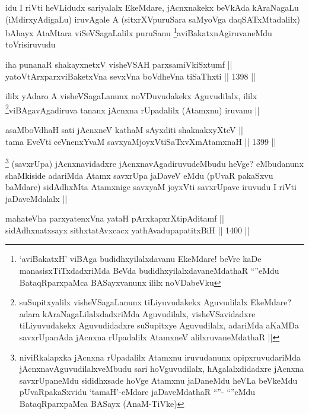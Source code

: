 \begin{artha}
idu I riVti heVLidudx sariyalalx EkeMdare, jAcnxnakekx beVkAda kAraNagaLu (iMdirxyAdigaLu) iruvAgale A (sitxrXVpuruSara saMyoVga daqSATxMtadalilx) bAhayx AtaMtara viSeVSagaLalilx puruSanu \footnote{`aviBakatxH' viBAga budidhxyilalxdavanu EkeMdare! beVre kaDe manasisxTiTxdadxriMda BeVda budidhxyilalxdavaneMdathaR ``\stext''eMdu BataqRparxpaMca BASayxvanunx ililx noVDabeVku}aviBakatxnAgiruvaneMdu toVrisiruvudu
\end{artha}

\begin{shl}
iha punanaR shakayxnetxV visheVSAH parxsamiVkiSxtumf || \\
yatoV\s tArxparxviBaketxVna sevxVna boVdheVna tiSaThxti ||  1398 ||  
\end{shl}

\begin{artha}
ililx yAdaro A visheVSagaLanunx noVDuvudakekx Aguvudilalx, ililx \footnote{suSupitxyalilx visheVSagaLanunx tiLiyuvudakekx Aguvudilalx EkeMdare? adara kAraNagaLilalxdadxriMda Aguvudilalx, visheVSavidadxre tiLiyuvudakekx Aguvudidadxre suSupitxye Aguvudilalx, adariMda aKaMDa savxrUpanAda jAcnxna rUpadalilx AtamxneV alilxruvaneMdathaR ||}viBAgavAgadiruva tananx jAcnxna rUpadalilx (Atamxnu) iruvanu ||
\end{artha}


\begin{shl}
asaMboVdhaH sati jAcnxneV kathaM sAyxditi shaknakxyXteV || \\
tama EveVti ceVnenxYvaM savxyaMjoyxVtiSaTxvXmAtamxnaH ||  1399 ||  
\end{shl}

\begin{artha}
\footnote{niviRkalapxka jAcnxna rUpadalilx Atamxnu iruvudanunx opipxruvudariMda jAcnxnavAguvudilalxveMbudu sari hoVguvudilalx, hAgalalxdidadxre jAcnxna savxrUpaneMdu sididhxsade hoVge Atamxnu jaDaneMdu heVLa beVkeMdu pUvaRpakaSxvidu `tamaH'-eMdare jaDaveMdathaR ``\stext''- ``\stext''eMdu BataqRparxpaMca BASayx (AnaM-TiVke)}
(savxrUpa) jAcnxnavidadxre jAcnxnavAgadiruvudeMbudu heVge? eMbudanunx shaMkiside adariMda Atamx savxrUpa jaDaveV eMdu (pUvaR pakaSxvu baMdare) sidAdhxMta Atamxnige savxyaM joyxVti savxrUpave iruvudu I riVti jaDaveMdalalx ||
\end{artha}

\begin{shl}
mahateVha parxyatenxVna yataH pArxkapxrXtipAditamf ||  \\
sidAdhxnatxsayx sithxtatAvxcacx yathAvadupapatitxBiH ||  1400 ||  
\end{shl}

